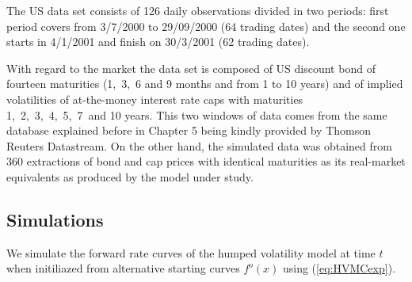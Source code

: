 
The US data set consists of 126 daily observations divided in two periods: 
first period covers from 3/7/2000 to 29/09/2000 (64 trading dates) and the second one
starts in 4/1/2001 and finish on 30/3/2001 (62 trading dates). 


With regard to the market the data set is composed of US discount bond of fourteen
maturities (1,~3,~6 and 9 months and from 1 to 10 years) and of implied
volatilities of at-the-money interest rate  caps with maturities
1,~2,~3,~4,~5,~7~and 10 years. This two windows of data comes from the same
database explained before in Chapter 5 being kindly provided by
Thomson Reuters Datastream. On the other hand, the simulated data was
obtained from 360 extractions of bond and cap prices with identical
maturities as its real-market equivalents as produced by the model
under study.

\subsection*{Simulations}
We simulate the forward rate curves of the humped volatility model at
time $t$ when initiliazed from alternative starting curves $f^o(x)$
using (\ref{eq:HVMCexp}).

